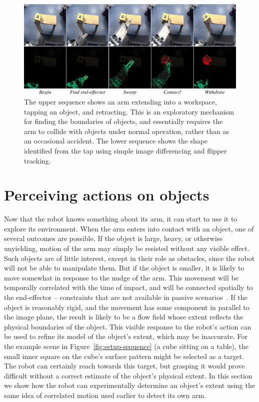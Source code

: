 \begin{figure}[tb]
\begin{center}
\includegraphics[width=\columnwidth]{poking-sequence.eps}

\caption{ 
\label{fig:poking-sequence}
%
  The upper sequence shows an arm extending into a workspace, tapping
  an object, and retracting.  This is an exploratory mechanism for
  finding the boundaries of objects, and essentially requires the arm
  to collide with objects under normal operation, rather than as an
  occasional accident.  The lower sequence shows the shape
  identified from the tap using simple image differencing and flipper
  tracking.
%
}
\end{center}
\end{figure}



\section{Perceiving actions on objects}

Now that the robot knows something about its arm, it can start
to use it to explore its environment.
When the arm enters into contact with an object, one of several
outcomes are possible.  If the object is large, heavy, or otherwise
unyielding, motion of the arm may simply be resisted without any
visible effect.  Such objects are of little interest, except in their
role as obstacles, since the robot will not be able to manipulate
them.  But if the object is smaller, it is likely to move somewhat in
response to the nudge of the arm.  This movement will be temporally
correlated with the time of impact, and will be connected spatially to
the end-effector -- constraints that are not available in passive
scenarios~\cite{birchfield99depth}.  If the object is reasonably
rigid, and the movement has some component in parallel to the image
plane, the result is likely to be a flow field whose extent reflects
the physical boundaries of the object.  This visible response to
the robot's action can be used to refine its model of the object's
extent, which may be inaccurate.  For the example scene in
Figure~\ref{fig:setup-sequence} (a cube sitting on a table), the small
inner square on the cube's surface pattern might be selected as a
target.  The robot can certainly reach towards this target, but
grasping it would prove difficult without a correct estimate of the
object's physical extent.  In this section we show how the robot can
experimentally determine an object's extent using the same idea of
correlated motion used earlier to detect its own arm.

